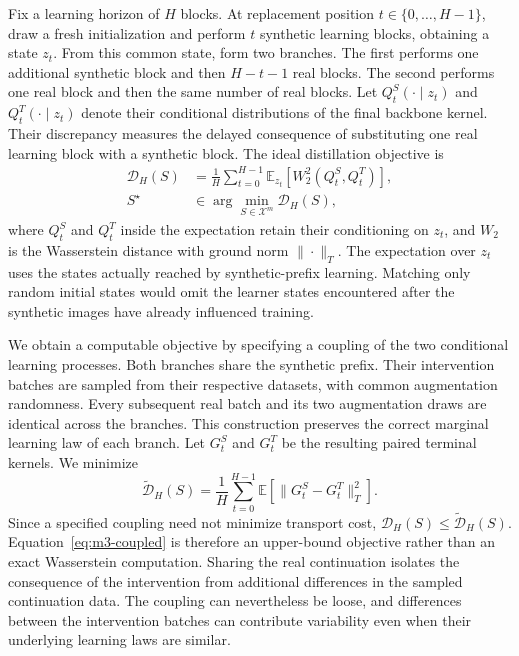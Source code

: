 Fix a learning horizon of $H$ blocks. At replacement position $t\in\{0,\ldots,H-1\}$, draw a fresh initialization and perform $t$ synthetic learning blocks, obtaining a state $z_t$. From this common state, form two branches. The first performs one additional synthetic block and then $H-t-1$ real blocks. The second performs one real block and then the same number of real blocks. Let $Q_t^S(\cdot\mid z_t)$ and $Q_t^T(\cdot\mid z_t)$ denote their conditional distributions of the final backbone kernel. Their discrepancy measures the delayed consequence of substituting one real learning block with a synthetic block. The ideal distillation objective is
\begin{equation}
\begin{aligned}
\mathcal D_H(S)
&=\frac{1}{H}\sum_{t=0}^{H-1}\mathbb E_{z_t}\!\left[
W_2^2\!\left(Q_t^S,Q_t^T\right)\right],\\
S^\star&\in\arg\min_{S\in\mathcal X^m}\mathcal D_H(S),
\end{aligned}
\label{eq:m3-ideal}
\end{equation}
where $Q_t^S$ and $Q_t^T$ inside the expectation retain their conditioning on $z_t$, and $W_2$ is the Wasserstein distance with ground norm $\|\cdot\|_T$. The expectation over $z_t$ uses the states actually reached by synthetic-prefix learning. Matching only random initial states would omit the learner states encountered after the synthetic images have already influenced training.

We obtain a computable objective by specifying a coupling of the two conditional learning processes. Both branches share the synthetic prefix. Their intervention batches are sampled from their respective datasets, with common augmentation randomness. Every subsequent real batch and its two augmentation draws are identical across the branches. This construction preserves the correct marginal learning law of each branch. Let $G_t^S$ and $G_t^T$ be the resulting paired terminal kernels. We minimize
\begin{equation}
\widetilde{\mathcal D}_H(S)
=\frac{1}{H}\sum_{t=0}^{H-1}
\mathbb E\!\left[\|G_t^S-G_t^T\|_T^2\right].
\label{eq:m3-coupled}
\end{equation}
Since a specified coupling need not minimize transport cost, $\mathcal D_H(S)\le\widetilde{\mathcal D}_H(S)$. Equation~\eqref{eq:m3-coupled} is therefore an upper-bound objective rather than an exact Wasserstein computation. Sharing the real continuation isolates the consequence of the intervention from additional differences in the sampled continuation data. The coupling can nevertheless be loose, and differences between the intervention batches can contribute variability even when their underlying learning laws are similar.

